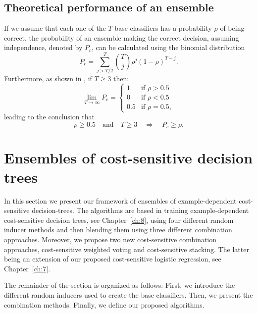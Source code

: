 {\subsection{Theoretical performance of an ensemble}
  If we assume that each one of the $T$ base classifiers has a probability $\rho$ of 
  being correct, the probability of an ensemble making the correct decision, assuming independence, 
  denoted by $P_c$, can be calculated using the binomial \mbox{distribution \citep{Hansen1990}}
  \begin{equation}\label{eq:9:prob}
    P_c = \sum_{j>T/2}^{T} {{T}\choose{j}} \rho^j(1-\rho)^{T-j}.
  \end{equation}
  Furthermore, as shown in \cite{Lam1997}, if $T\ge3$ then:
  \begin{equation}\label{eq:9:Pc}
  \lim_{T \to  \infty} P_c= \begin{cases} 
            1  &\mbox{if } \rho>0.5 \\ 
            0  &\mbox{if } \rho<0.5 \\ 
            0.5  &\mbox{if } \rho=0.5 ,
            \end{cases}
  \end{equation}
	leading to the conclusion that 
	\begin{equation}\label{eq:9:Pc2}
  \rho \ge 0.5 \quad \text{and} \quad T\ge3 \quad \Rightarrow \quad P_c\ge \rho.
  \end{equation}
  
      
\section{Ensembles of cost-sensitive decision trees}
\label{sec:9:ecsdt}

In this section we present our framework of ensembles of  example-dependent 
cost-sensitive  decision-trees. The algorithms are based in training example-dependent 
cost-sensitive decision trees, see Chapter~\ref{ch:8}, using four different  random inducer methods 
and then blending them using three different combination approaches. Moreover, we propose two new 
cost-sensitive combination approaches, cost-sensitive weighted  voting and cost-sensitive stacking. 
The latter being an extension of our proposed cost-sensitive logistic regression, see 
Chapter~\ref{ch:7}. 

The remainder of the section is organized as follows: First, we introduce the different random 
inducers used to create the base classifiers. Then, we present the combination methods. Finally, we 
define our proposed algorithms.


}
